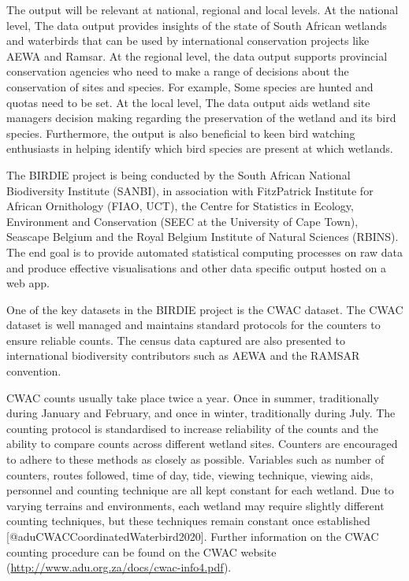 \documentclass[
]{article}
\begin{document}
The output will be relevant at national, regional and local levels. At
the national level, The data output provides insights of the state of
South African wetlands and waterbirds that can be used by international
conservation projects like AEWA and Ramsar. At the regional level, the
data output supports provincial conservation agencies who need to make a
range of decisions about the conservation of sites and species. For
example, Some species are hunted and quotas need to be set. At the local
level, The data output aids wetland site managers decision making
regarding the preservation of the wetland and its bird species.
Furthermore, the output is also beneficial to keen bird watching
enthusiasts in helping identify which bird species are present at which
wetlands.

The BIRDIE project is being conducted by the South African National
Biodiversity Institute (SANBI), in association with FitzPatrick
Institute for African Ornithology (FIAO, UCT), the Centre for Statistics
in Ecology, Environment and Conservation (SEEC at the University of Cape
Town), Seascape Belgium and the Royal Belgium Institute of Natural
Sciences (RBINS). The end goal is to provide automated statistical
computing processes on raw data and produce effective visualisations and
other data specific output hosted on a web app.

One of the key datasets in the BIRDIE project is the CWAC dataset. The
CWAC dataset is well managed and maintains standard protocols for the
counters to ensure reliable counts. The census data captured are also
presented to international biodiversity contributors such as AEWA and
the RAMSAR convention.

CWAC counts usually take place twice a year. Once in summer,
traditionally during January and February, and once in winter,
traditionally during July. The counting protocol is standardised to
increase reliability of the counts and the ability to compare counts
across different wetland sites. Counters are encouraged to adhere to
these methods as closely as possible. Variables such as number of
counters, routes followed, time of day, tide, viewing technique, viewing
aids, personnel and counting technique are all kept constant for each
wetland. Due to varying terrains and environments, each wetland may
require slightly different counting techniques, but these techniques
remain constant once established {[}@aduCWACCoordinatedWaterbird2020{]}.
Further information on the CWAC counting procedure can be found on the
CWAC website (\url{http://www.adu.org.za/docs/cwac-info4.pdf}).
\end{document}

